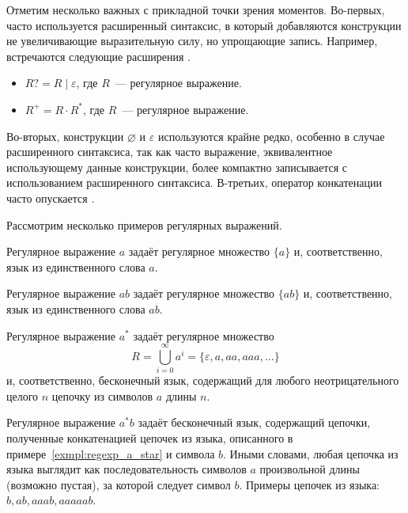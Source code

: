 Отметим несколько важных с прикладной точки зрения моментов.
Во-первых, часто используется расширенный синтаксис, в который добавляются конструкции не увеличивающие выразительную силу, но упрощающие запись.
Например, встречаются следующие расширения%
.
\begin{itemize}
    \item $R? = R \mid \varepsilon$, где $R$~--- регулярное выражение.
    \item $R^+ = R \cdot R^*$, где $R$~--- регулярное выражение.
\end{itemize}

Во-вторых, конструкции $\varnothing$ и $\varepsilon$ используются крайне редко, особенно в случае расширенного синтаксиса, так как часто выражение, эквивалентное использующему данные конструкции, более компактно записывается с использованием расширенного синтаксиса.
В-третьих, оператор конкатенации часто опускается%
.

Рассмотрим несколько примеров регулярных выражений.
\begin{example}
    Регулярное выражение $a$ задаёт регулярное множество $\{a\}$ и, соответственно, язык из единственного слова $a$.
\end{example}


\begin{example}
    Регулярное выражение $ab$ задаёт регулярное множество $\{ab\}$ и, соответственно, язык из единственного слова $ab$.
\end{example}


\begin{example}\label{exmpl:regexp_a_star}
    Регулярное выражение $a^*$ задаёт регулярное множество \[R = \bigcup_{i=0}^{\infty}{a^i} = \{\varepsilon, a, aa, aaa, \ldots \}\] и, соответственно, бесконечный язык, содержащий для любого неотрицательного целого $n$ цепочку из символов $a$ длины $n$.
\end{example}

\begin{example}
    Регулярное выражение $a^*b$ задаёт бесконечный язык, содержащий цепочки, полученные конкатенацией цепочек из языка, описанного в примере~\ref{exmpl:regexp_a_star} и символа $b$.
    Иными словами, любая цепочка из языка выглядит как последовательность символов $a$ произвольной длины (возможно пустая), за которой следует символ $b$.
    Примеры цепочек из языка: $b, ab, aaab, aaaaab$.
\end{example}

